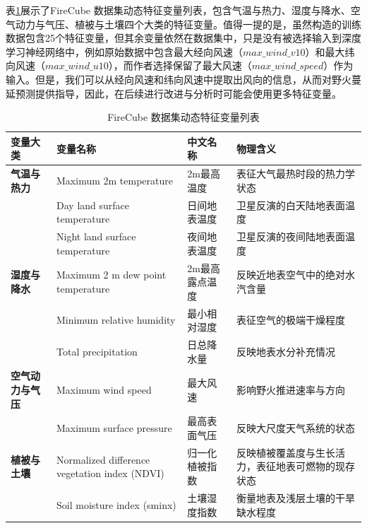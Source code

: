 表\ref{tab:dynamic_vars}展示了FireCube 数据集动态特征变量列表，包含气温与热力、湿度与降水、空气动力与气压、植被与土壤四个大类的特征变量。值得一提的是，虽然\textcite{prapas2022training}构造的训练数据包含25个特征变量，但其余变量依然在数据集中，只是没有被选择输入到深度学习神经网络中，例如原始数据中包含最大经向风速（$max\_wind\_v10$）和最大纬向风速（$max\_wind\_u10$），而作者选择保留了最大风速（$max\_wind\_speed$）作为输入。但是，我们可以从经向风速和纬向风速中提取出风向的信息，从而对野火蔓延预测提供指导，因此，在后续进行改进与分析时可能会使用更多特征变量。

\begin{table}[htbp]
    \centering
    \caption{FireCube 数据集动态特征变量列表}
    \label{tab:dynamic_vars}
    \renewcommand{\arraystretch}{1.5} 
    \begin{tabularx}{\textwidth}{
        >{\raggedright\arraybackslash}p{2.8cm} 
        >{\raggedright\arraybackslash}p{4.5cm} 
        >{\raggedright\arraybackslash}p{2.5cm} 
        >{\raggedright\arraybackslash}X }
        \toprule
        \textbf{变量大类} & \textbf{变量名称} & \textbf{中文名称} & \textbf{物理含义} \\
        \midrule
        
        \textbf{气温与热力} 
        & Maximum 2m temperature & 2m最高温度 & 表征大气最热时段的热力学状态 \\
        & Day land surface temperature & 日间地表温度 & 卫星反演的白天陆地表面温度 \\
        & Night land surface temperature & 夜间地表温度 & 卫星反演的夜间陆地表面温度 \\
        \midrule
        
        \textbf{湿度与降水} 
        & Maximum 2 m dew point temperature & 2m最高露点温度 & 反映近地表空气中的绝对水汽含量 \\
        & Minimum relative humidity & 最小相对湿度 & 表征空气的极端干燥程度\\
        & Total precipitation & 日总降水量 & 反映地表水分补充情况\\
        \midrule
        
        \textbf{空气动力与气压} 
        & Maximum wind speed & 最大风速 & 影响野火推进速率与方向 \\
        & Maximum surface pressure & 最高表面气压 & 反映大尺度天气系统的状态 \\
        \midrule
        
        \textbf{植被与土壤} 
        & Normalized difference vegetation index (NDVI) & 归一化植被指数 & 反映植被覆盖度与生长活力，表征地表可燃物的现存状态 \\
        & Soil moisture index (sminx) & 土壤湿度指数 & 衡量地表及浅层土壤的干旱缺水程度 \\
        
        \bottomrule
    \end{tabularx}
\end{table}

